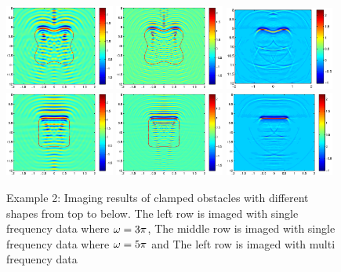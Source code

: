 \documentclass[12pt]{iopart}
\begin{document}
\begin{figure}
	\includegraphics[width=0.32\textwidth]{./graphic/p_leaf_3pi.eps}
	\includegraphics[width=0.32\textwidth]{./graphic/p_leaf_5pi.eps}
	\includegraphics[width=0.32\textwidth]{./graphic/p_leaf.eps}
	\includegraphics[width=0.32\textwidth]{./graphic/rectangle_3pi.eps}
	\includegraphics[width=0.32\textwidth]{./graphic/rectangle_5pi.eps}
	\includegraphics[width=0.32\textwidth]{./graphic/rectangle.eps}
	
	\caption{Example 2: Imaging results of clamped obstacles
		with different shapes from top to below. The left row is imaged with single frequency data where $\omega=3\pi$, The middle row is imaged with single frequency data where $\omega=5\pi$ and The left row is imaged with multi frequency data}\label{figure_2}
\end{figure}
\end{document}
